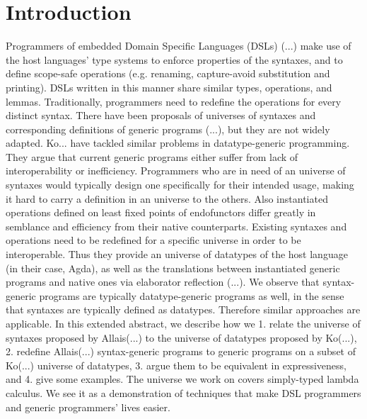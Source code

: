 \documentclass[sigplan,review,fleqn]{acmart}
\begin{document}
\maketitle


\section{Introduction}
\label{sec:introduction}
Programmers of embedded Domain Specific Languages (DSLs) (...) make use of the host languages' type systems to enforce properties of the syntaxes, and to define scope-safe operations (e.g. renaming, capture-avoid substitution and printing).
DSLs written in this manner share similar types, operations, and lemmas.
Traditionally, programmers need to redefine the operations for every distinct syntax.
There have been proposals of universes of syntaxes and corresponding definitions of generic programs (...), but they are not widely adapted.
Ko... have tackled similar problems in datatype-generic programming.
They argue that current generic programs either suffer from lack of interoperability or inefficiency.
Programmers who are in need of an universe of syntaxes would typically design one specifically for their intended usage, making it hard to carry a definition in an universe to the others.
Also instantiated operations defined on least fixed points of endofunctors differ greatly in semblance and efficiency from their native counterparts.
Existing syntaxes and operations need to be redefined for a specific universe in order to be interoperable.
Thus they provide an universe of datatypes of the host language (in their case, Agda), as well as the translations between instantiated generic programs and native ones via elaborator reflection (...).
We observe that syntax-generic programs are typically datatype-generic programs as well, in the sense that syntaxes are typically defined as datatypes.
Therefore similar approaches are applicable.
In this extended abstract, we describe how we 1. relate the universe of syntaxes proposed by Allais(...) to the universe of datatypes proposed by Ko(...), 2. redefine Allais(...) syntax-generic programs to generic programs on a subset of Ko(...) universe of datatypes, 3. argue them to be equivalent in expressiveness, and 4. give some examples.
The universe we work on covers simply-typed lambda calculus. 
We see it as a demonstration of techniques that make DSL programmers and generic programmers' lives easier.
\end{document}
